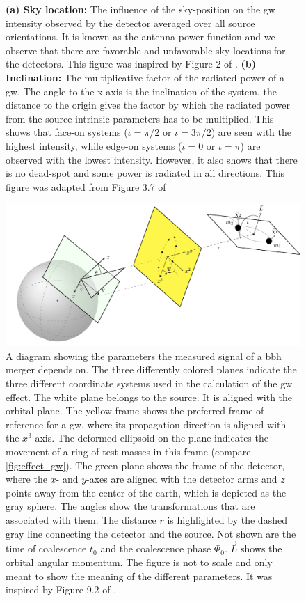 \begin{figure}
	\caption[Gravitational wave angular power distributions]{\textbf{(a) Sky location:} The influence of the sky-position on the \acrshort{gw} intensity observed by the detector averaged over all source orientations. It is known as the antenna power function and we observe that there are favorable and unfavorable sky-locations for the detectors. This figure was inspired by Figure 2 of \cite{Schutz:2011tw}. \textbf{(b) Inclination:} The multiplicative factor of the radiated power of a \acrshort{gw}. The angle to the x-axis is the inclination of the system, the distance to the origin gives the factor by which the radiated power from the source intrinsic parameters has to be multiplied. This shows that face-on systems ($\iota=\pi/2$ or $\iota=3\pi/2$) are seen with the highest intensity, while edge-on systems ($\iota=0$ or $\iota=\pi$) are observed with the lowest intensity. However, it also shows that there is no dead-spot and some power is radiated in all directions. This figure was adapted from Figure 3.7 of \cite{Maggiore:2008aaa}}
\end{figure}
\begin{figure}
	\centering
	\includegraphics[width=\textwidth]{chapters/foundations/sections/cbc_searches/images/gw_params.pdf}
	\caption[Gravitational wave signal parameters]{A diagram showing the parameters the measured signal of a \acrshort{bbh} merger depends on. The three differently colored planes indicate the three different coordinate systems used in the calculation of the \acrshort{gw} effect. The white plane belongs to the source. It is aligned with the orbital plane. The yellow frame shows the preferred frame of reference for a \acrshort{gw}, where its propagation direction is aligned with the $x^3$-axis. The deformed ellipsoid on the plane indicates the movement of a ring of test masses in this frame (compare \autoref{fig:effect_gw}). The green plane shows the frame of the detector, where the $x$- and $y$-axes are aligned with the detector arms and $z$ points away from the center of the earth, which is depicted as the gray sphere. The angles show the transformations that are associated with them. The distance $r$ is highlighted by the dashed gray line connecting the detector and the source. Not shown are the time of coalescence $t_0$ and the coalescence phase $\Phi_0$. $\vec{L}$ shows the orbital angular momentum. The figure is not to scale and only meant to show the meaning of the different parameters. It was inspired by Figure 9.2 of \cite{Hawking:1989aaa}.}\label{fig:gw_params}
\end{figure}

